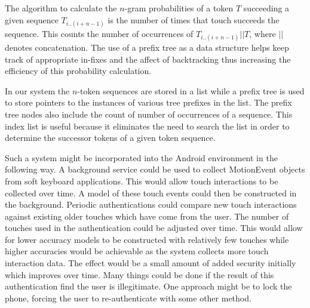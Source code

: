 \documentclass{acm_proc_article-sp}
\begin{document}
The algorithm to calculate the $n$-gram probabilities of
a token $T$ succeeding a given sequence
$T_{i..(i+n-1)}$ is the number of times that touch succeeds the sequence.
This counts the  number of 
occurrences of $T_{i..(i+n-1)}||T$,
where $||$ denotes concatenation.
The use of a prefix tree as a data structure helps keep track of appropriate
in-fixes and the affect of backtracking thus increasing the efficiency of this probability calculation.

In our system the $n$-token sequences are stored in a list
while a prefix tree is used to store pointers to the
instances of various tree prefixes in the list.
The prefix tree nodes also include the count of number of occurrences of a sequence.
This index list is useful because it eliminates the need to search the list in order to determine the successor tokens of
a given token sequence.

Such a system might be incorporated 
into the Android environment in the following way.
A background service could be used to collect MotionEvent objects
from soft keyboard applications.
This would allow touch interactions to be collected over time.
A model of these touch events could then
be constructed in the background.
Periodic authentications could compare new touch interactions 
against existing older touches which have come from the user.
%
The number of touches used in the authentication could be
adjusted over time.
This would allow for lower accuracy models to be
constructed with relatively few touches while
higher accuracies would be achievable as
the system collects more touch interaction data.
The effect would be a small amount of added
security initially which improves over time.
%
Many things could be done if the result of this authentication
find the user is illegitimate.
One approach might be to lock the phone,
forcing the user to re-authenticate with some other method.

\end{document}
